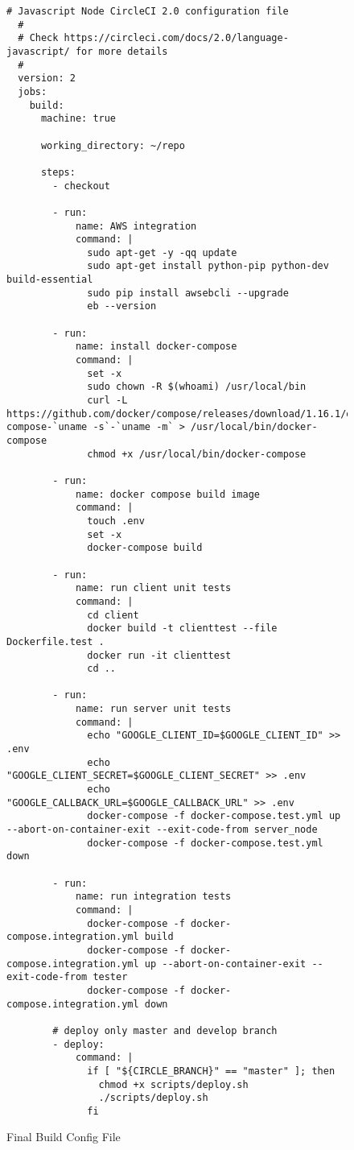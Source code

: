 \begin{figure}[h!]
  \begin{lstlisting}[basicstyle=\tiny, breaklines=true]
  # Javascript Node CircleCI 2.0 configuration file
  #
  # Check https://circleci.com/docs/2.0/language-javascript/ for more details
  #
  version: 2
  jobs:
    build:
      machine: true

      working_directory: ~/repo

      steps:
        - checkout

        - run:
            name: AWS integration
            command: |
              sudo apt-get -y -qq update
              sudo apt-get install python-pip python-dev build-essential
              sudo pip install awsebcli --upgrade
              eb --version

        - run:
            name: install docker-compose
            command: |
              set -x
              sudo chown -R $(whoami) /usr/local/bin
              curl -L https://github.com/docker/compose/releases/download/1.16.1/docker-compose-`uname -s`-`uname -m` > /usr/local/bin/docker-compose
              chmod +x /usr/local/bin/docker-compose

        - run:
            name: docker compose build image
            command: |
              touch .env
              set -x
              docker-compose build

        - run:
            name: run client unit tests
            command: |
              cd client
              docker build -t clienttest --file Dockerfile.test .
              docker run -it clienttest
              cd ..

        - run:
            name: run server unit tests
            command: |
              echo "GOOGLE_CLIENT_ID=$GOOGLE_CLIENT_ID" >> .env
              echo "GOOGLE_CLIENT_SECRET=$GOOGLE_CLIENT_SECRET" >> .env
              echo "GOOGLE_CALLBACK_URL=$GOOGLE_CALLBACK_URL" >> .env
              docker-compose -f docker-compose.test.yml up --abort-on-container-exit --exit-code-from server_node
              docker-compose -f docker-compose.test.yml down

        - run:
            name: run integration tests
            command: |
              docker-compose -f docker-compose.integration.yml build
              docker-compose -f docker-compose.integration.yml up --abort-on-container-exit --exit-code-from tester
              docker-compose -f docker-compose.integration.yml down

        # deploy only master and develop branch
        - deploy:
            command: |
              if [ "${CIRCLE_BRANCH}" == "master" ]; then
                chmod +x scripts/deploy.sh
                ./scripts/deploy.sh
              fi
  \end{lstlisting}
  \caption{Final Build Config File}
  \label{sample:circlecifinal}
\end{figure}
